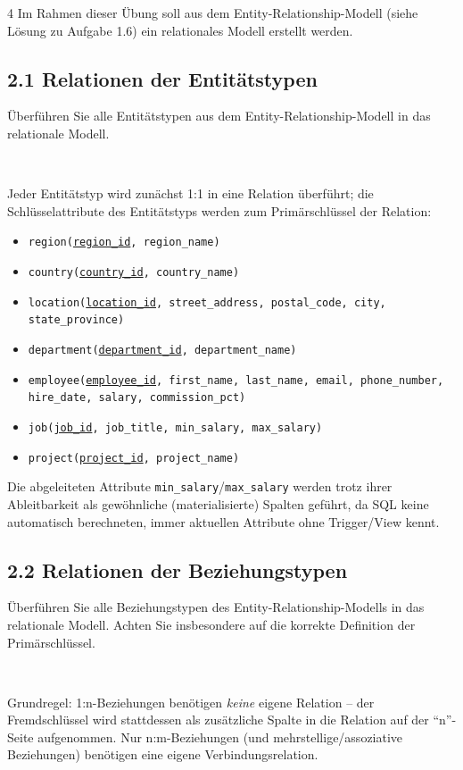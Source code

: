 \documentclass[8pt,a4paper]{extarticle}
\newenvironment{loesung}[1][]{%
    \par\noindent{\bfseries\color{loesungrahmen}\small$\blacktriangleright$~L\"osung#1:}~%
}{\par\smallskip}
\newcommand{\pk}[1]{\underline{#1}}
\begin{document}
\begin{multicols}{4}
Im Rahmen dieser \"Ubung soll aus dem Entity-Relationship-Modell (siehe L\"osung zu Aufgabe 1.6) ein relationales Modell erstellt werden.

\subsection*{2.1 \quad Relationen der Entit\"atstypen}
\"Uberf\"uhren Sie alle Entit\"atstypen aus dem Entity-Relationship-Modell in das relationale Modell.

\begin{loesung}
Jeder Entit\"atstyp wird zun\"achst 1:1 in eine Relation \"uberf\"uhrt; die Schl\"usselattribute des Entit\"atstyps werden zum Prim\"arschl\"ussel der Relation:
\begin{itemize}
\item \texttt{region(\pk{region\_id}, region\_name)}
\item \texttt{country(\pk{country\_id}, country\_name)}
\item \texttt{location(\pk{location\_id}, street\_address, postal\_code, city, state\_province)}
\item \texttt{department(\pk{department\_id}, department\_name)}
\item \texttt{employee(\pk{employee\_id}, first\_name, last\_name, email, phone\_number, hire\_date, salary, commission\_pct)}
\item \texttt{job(\pk{job\_id}, job\_title, min\_salary, max\_salary)}
\item \texttt{project(\pk{project\_id}, project\_name)}
\end{itemize}
Die abgeleiteten Attribute \texttt{min\_salary}/\texttt{max\_salary} werden trotz ihrer Ableitbarkeit als gew\"ohnliche (materialisierte) Spalten gef\"uhrt, da SQL keine automatisch berechneten, immer aktuellen Attribute ohne Trigger/View kennt.
\end{loesung}

\subsection*{2.2 \quad Relationen der Beziehungstypen}
\"Uberf\"uhren Sie alle Beziehungstypen des Entity-Relationship-Modells in das relationale Modell. Achten Sie insbesondere auf die korrekte Definition der Prim\"arschl\"ussel.

\begin{loesung}
Grundregel: 1:n-Beziehungen ben\"otigen \emph{keine} eigene Relation -- der Fremdschl\"ussel wird stattdessen als zus\"atzliche Spalte in die Relation auf der ``n''-Seite aufgenommen. Nur n:m-Beziehungen (und mehrstellige/assoziative Beziehungen) ben\"otigen eine eigene Verbindungsrelation.


\end{loesung}
\end{multicols}
\end{document}
